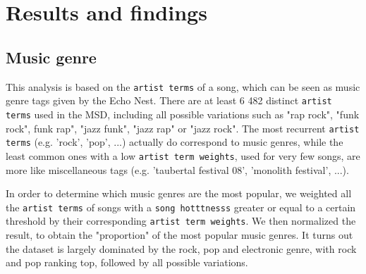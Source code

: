 \documentclass[11pt]{article}
\renewcommand\_{\textunderscore\allowbreak}
\begin{document}
\section{Results and findings}


\subsection{Music genre}
This analysis is based on the \texttt{artist terms} of a song, which can be seen as music genre tags given by the Echo Nest.
There are at least 6 482 distinct \texttt{artist terms} used in the MSD, including all possible variations such as "rap rock", "funk rock", funk rap", "jazz funk", "jazz rap" or "jazz rock".
The most recurrent \texttt{artist terms} (e.g. 'rock', 'pop', ...) actually do correspond to music genres, while the least common ones with a low \texttt{artist term weights}, used for very few songs, are more like miscellaneous tags (e.g. 'taubertal festival 08', 'monolith festival', ...).

In order to determine which music genres are the most popular, we weighted all the \texttt{artist terms} of songs with a \texttt{song hotttnesss} greater or equal to a certain threshold by their corresponding \texttt{artist term weights}. 
We then normalized the result, to obtain the "proportion" of the most popular music genres.
It turns out the dataset is largely dominated by the rock, pop and electronic genre, with rock and pop ranking top, followed by all possible variations.

\end{document}
